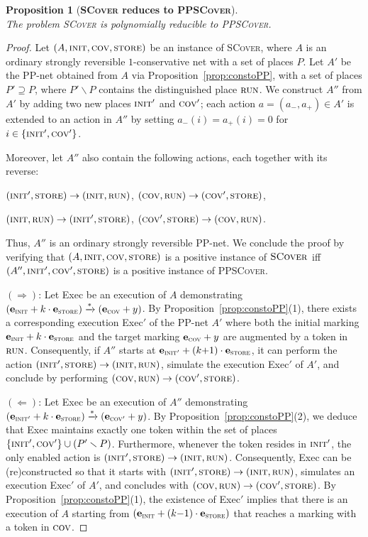 \documentclass[11pt,a4paper]{amsart}
\newcommand{\step}[1]{\mathrel{\xrightarrow{#1}}}
\newcommand{\reach}{\step{*}}
\newcommand{\SCover}{\textsc{SCover}\xspace}
\newcommand{\PPSCover}{\textsc{PPSCover}\xspace}
\newcommand{\pinit}{\textsc{init}}
\newcommand{\pcov}{\textsc{cov}}
\newcommand{\pstore}{\textsc{store}}
\newcommand{\prun}{\textsc{run}}
\let\origtextsc\textsc
\renewcommand{\textsc}[1]{\textnormal{\origtextsc{#1}}}
\theoremstyle{plain}
\newtheorem{prop}[thm]{Proposition}
\theoremstyle{definition}
\theoremstyle{defC}
\theoremstyle{thmC}
\begin{document}
\begin{prop}[\textbf{\SCover reduces to \PPSCover}]
\hfill\\
	The problem \SCover is polynomially reducible to \PPSCover.
\end{prop}
\begin{proof}
	Let $(A,\pinit, \pcov, \pstore)$ be an instance of \SCover,
where $A$ is an ordinary strongly reversible $1$-conservative net with
	a set of places $P$. 
Let $A'$ be the
	PP-net obtained from $A$ via Proposition~\ref{prop:constoPP},
with a set of places $P'\supseteq P$, where $P'\smallsetminus P$
	contains
	 the distinguished place $\prun$.
We construct $A''$ from $A'$ by adding two new places $\pinit'$ and
	$\pcov'$;
each action $a=(a_-,a_+)\in A'$ is extended to an
	action in $A''$ by setting $a_-(i)=a_+(i)=0$ for
	$i\in\{\pinit',\pcov'\}$.

Moreover, let $A''$ also contain
	the following 
	actions, each together with its reverse: 
	\begin{center}
	$(\pinit',\pstore)\rightarrow (\pinit,\prun)$, 
$(\pcov,\prun)\rightarrow(\pcov',\pstore)$,

	$(\pinit,\prun)\rightarrow(\pinit',\pstore)$,
	$(\pcov',\pstore)\rightarrow(\pcov,\prun)$. 
	\end{center}
Thus, $A''$ is an ordinary strongly reversible PP-net. We conclude the proof by verifying that 
	$(A,\pinit, \pcov, \pstore)$
	is a positive instance of $\SCover$ if{f}
	$(A'',\pinit', \pcov', \pstore)$ is a positive instance of \PPSCover.

	$(\Rightarrow)$:
Let Exec be an execution of $A$ demonstrating
$(\mathbf{e}_\pinit+k\cdot \mathbf{e}_\pstore)\reach
		(\mathbf{e}_\pcov+y)$.
By Proposition~\ref{prop:constoPP}(1), there exists a corresponding
execution  Exec$'$ of the PP-net $A'$ where both the initial marking
	$\mathbf{e}_{\pinit} + k \cdot
	\mathbf{e}_{\pstore}$ and the target marking
	$\mathbf{e}_{\pcov} + y$ are augmented by a token in
	$\prun$.
	Consequently, if $A''$ starts at $\mathbf{e}_{\pinit'}+(k{+}1)\cdot
	\mathbf{e}_\pstore$, it can perform the action
	$(\pinit',\pstore)\rightarrow (\pinit,\prun)$, simulate the
	execution Exec$'$ of $A'$, and conclude by performing
	$(\pcov,\prun)\rightarrow(\pcov',\pstore)$.



	$(\Leftarrow)$:
Let Exec be an execution of $A''$ demonstrating
	$(\mathbf{e}_{\pinit'}+k\cdot \mathbf{e}_\pstore)\reach
		(\mathbf{e}_{\pcov'}+y)$.
		By Proposition~\ref{prop:constoPP}(2), we deduce that Exec maintains
		exactly one token within the set of places
 $\{\pinit',\pcov'\}\cup (P'\smallsetminus P)$. Furthermore, whenever 
		the token resides in $\pinit'$, the only enabled action
		is $(\pinit',\pstore)\rightarrow (\pinit,\prun)$.
		Consequently, Exec can be (re)constructed so that it starts with
		$(\pinit',\pstore)\rightarrow (\pinit,\prun)$,
		simulates
		an execution Exec$'$ of $A'$, and concludes with
		$(\pcov,\prun)\rightarrow(\pcov',\pstore)$.
By Proposition~\ref{prop:constoPP}(1), the existence of Exec$'$ implies 
that there is an execution of $A$ starting from
$(\mathbf{e}_{\pinit}+(k{-}1)\cdot \mathbf{e}_\pstore)$ that reaches a
marking with a token in $\pcov$.
\end{proof}
\end{document}
